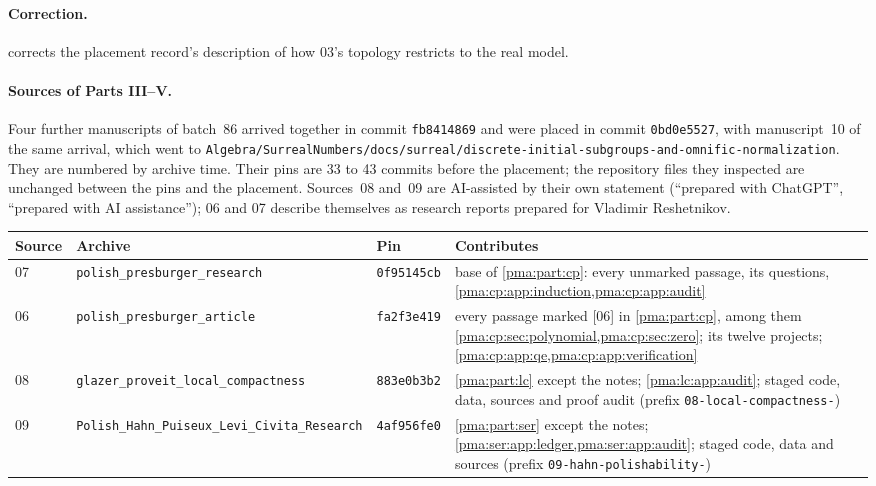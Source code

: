 \documentclass[11pt]{article}
\numberwithin{equation}{section}
\theoremstyle{definition}
\theoremstyle{remark}
\newcommand{\src}[1]{\textup{\textsf{\small[#1]}}}
\newcommand{\fn}[1]{\nolinkurl{#1}}
\begin{document}
\paragraph{Correction.}  corrects the placement
record's description of how 03's topology restricts to the real model.

\paragraph{Sources of Parts III--V.} Four further manuscripts of batch~86
arrived together in commit \texttt{fb8414869} and were placed in commit
\texttt{0bd0e5527}, with manuscript~10 of the same arrival, which went to
\fn{Algebra/SurrealNumbers/docs/surreal/discrete-initial-subgroups-and-omnific-normalization}.
They are numbered by archive time. Their pins are 33 to 43 commits before
the placement; the repository files they inspected are unchanged between the
pins and the placement. Sources~08 and~09 are AI-assisted by their own
statement (``prepared with ChatGPT'', ``prepared with AI assistance''); 06 and
07 describe themselves as research reports prepared for Vladimir Reshetnikov.

\begin{center}\small
\begin{tabular}{@{}P{.07\textwidth}P{.30\textwidth}P{.14\textwidth}P{.40\textwidth}@{}}
\toprule
Source & Archive & Pin & Contributes\\
 & \fn{polish_presburger_research} & \texttt{0f95145cb} & base of \cref{pma:part:cp}: every unmarked passage, its questions, \cref{pma:cp:app:induction,pma:cp:app:audit}\\
06 & \fn{polish_presburger_article} & \texttt{fa2f3e419} & every passage marked \src{06} in \cref{pma:part:cp}, among them \cref{pma:cp:sec:polynomial,pma:cp:sec:zero}; its twelve projects; \cref{pma:cp:app:qe,pma:cp:app:verification}\\
08 & \fn{glazer_proveit_local_compactness} & \texttt{883e0b3b2} & \cref{pma:part:lc} except the notes; \cref{pma:lc:app:audit}; staged code, data, sources and proof audit (prefix \fn{08-local-compactness-})\\
09 & \fn{Polish_Hahn_Puiseux_Levi_Civita_Research} & \texttt{4af956fe0} & \cref{pma:part:ser} except the notes; \cref{pma:ser:app:ledger,pma:ser:app:audit}; staged code, data and sources (prefix \fn{09-hahn-polishability-})\\
\bottomrule
\end{tabular}
\end{center}
\end{document}
